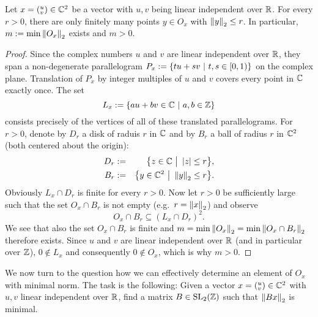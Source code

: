 \begin{lemma}
\label{lem_SL2FunDomMinExists}
Let $x = ({}^u_v) \in \mathbb{C}^2$ be a vector with $u,v$ being linear independent over $\mathbb{R}$. For every $r > 0$, there are only finitely many points $y \in O_x$ with $\left\| y \right\|_2 \le r$. In particular, $m := \min{\left\| O_x \right\|_2}$ exists and $m > 0$.
\end{lemma}
\begin{proof}
Since the complex numbers $u$ and $v$ are linear independent over $\mathbb{R}$, they span a non-degenerate parallelogram $P_x := \{ t u + s v \ | \ t,s \in [0,1) \}$ on the complex plane. Translation of $P_x$ by integer multiples of $u$ and $v$ covers every point in $\mathbb{C}$ exactly once. The set
\begin{equation}
L_x := \{ a u + b v \in \mathbb{C} \ | \ a,b \in \mathbb{Z} \}
\end{equation}
consists precisely of the vertices of all of these translated parallelograms. For $r > 0$, denote by $D_r$ a disk of raduis $r$ in $\mathbb{C}$ and by $B_r$ a ball of radius $r$ in $\mathbb{C}^2$ (both centered about the origin):
\begin{eqnarray}
D_r &:=& \big\{ z \in \mathbb{C} \ \big| \ \left|z\right| \le r \big\},\\
B_r &:=& \big\{ y \in \mathbb{C}^2 \ \big| \ \left\| y \right\|_2 \le r \big\}.
\end{eqnarray}
Obviously $L_x \cap D_r$ is finite for every $r > 0$. Now let $r > 0$ be sufficiently large such that the set $O_x \cap B_r$ is not empty (e.g.\ $r = \left\| x \right\|_2$) and observe
\begin{equation*}
O_x \cap B_r \subseteq (L_x \cap D_r)^2.
\end{equation*}
We see that also the set $O_x \cap B_r$ is finite and $m = \min{\left\| O_x \right\|_2} = \min{\left\| O_x \cap B_r \right\|_2}$ therefore exists. Since $u$ and $v$ are linear independent over $\mathbb{R}$ (and in particular over $\mathbb{Z}$), $0 \notin L_x$ and consequently $0 \notin O_x$, which is why $m > 0$.
\end{proof}

We now turn to the question how we can effectively determine an element of $O_x$ with minimal norm. The task is the following: Given a vector $x = ({}^u_v) \in \mathbb{C}^2$ with $u,v$ linear independent over $\mathbb{R}$, find a matrix $B \in \operatorname{SL}_{2}(\mathbb{Z})$ such that $\left\| Bx \right\|_2$ is minimal. 

